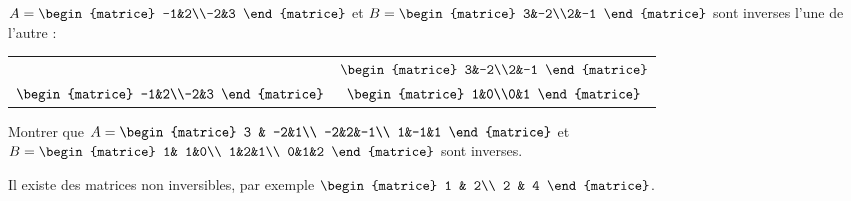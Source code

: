 \begin{exemple}[]
	$A=\begin{matrice}
			-1&2\\-2&3
		\end{matrice}$ et $B=\begin{matrice}
			3&-2\\2&-1
		\end{matrice}$ sont inverses l'une de l'autre :
	\begin{center}
		\begin{tabular}{cc}
			 & $\begin{matrice}
					    3&-2\\2&-1
				    \end{matrice}$ \\
			$\begin{matrice}
					 -1&2\\-2&3
				 \end{matrice}$
			 & $\begin{matrice}
					    1&0\\0&1
				    \end{matrice}$
		\end{tabular}
	\end{center}
\end{exemple}
\begin{exercice}[]
	Montrer que $A=\begin{matrice}
			3 & -2&1\\
			-2&2&-1\\
			1&-1&1
		\end{matrice}$ et
	$B=\begin{matrice}
			1& 1&0\\
			1&2&1\\
			0&1&2
		\end{matrice}$ sont inverses.
	
\end{exercice}
\begin{remarque}[]
	Il existe des matrices non inversibles, par exemple $\begin{matrice}
			1 & 2\\ 2 & 4
		\end{matrice}$.
\end{remarque}


